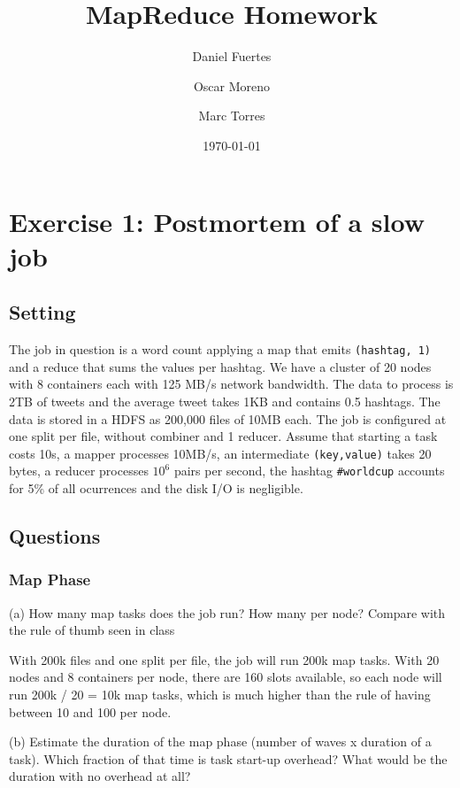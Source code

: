 \documentclass[11pt,a4paper]{article}
\title{MapReduce Homework}
\author{
    Daniel Fuertes\\
    \and
    Oscar Moreno\\
    \and
    Marc Torres\\
}
\date{\today}
\begin{document}
\maketitle
\section*{Exercise 1: Postmortem of a slow job}
\subsection*{Setting}
The job in question is a word count applying a map that emits \texttt{(hashtag, 1)} and a reduce that sums the values per hashtag. We have a cluster 
of 20 nodes with 8 containers each with 125 MB/s network bandwidth. The data to process is 2TB of tweets and the average tweet takes 1KB and contains 0.5 hashtags. The data is stored in a HDFS as 200,000 files of 10MB each. 
The job is configured at one split per file, without combiner and 1 reducer. \newline
Assume that starting a task costs 10s, a mapper processes 10MB/s, an intermediate \texttt{(key,value)} takes 20 bytes, a reducer processes $10^6$ pairs per second, the hashtag \texttt{\#worldcup} accounts for 5\% of all ocurrences and the disk I/O is negligible.
\subsection*{Questions}

\subsubsection*{Map Phase}
\begin{tcolorbox}[colback=gray!20,colframe=gray!20, sharp corners]
(a) How many map tasks does the job run? How many per node? Compare with the rule of thumb seen in class
\end{tcolorbox}

With 200k files and one split per file, the job will run 200k map tasks. With 20 nodes and 8 containers per node, there are 160 slots available, so each node will run 200k / 20 = 10k map tasks, which is much higher than the rule of having between 10 and 100 per node.

\begin{tcolorbox}[colback=gray!20,colframe=gray!20, sharp corners]
(b) Estimate the duration of the map phase (number of waves x duration of a task). Which fraction of that time is task start-up overhead? What would be the duration with no overhead at all?
\end{tcolorbox}
\end{document}
